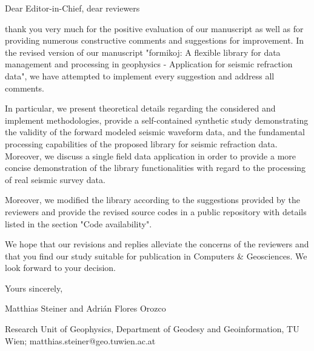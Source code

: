 \documentclass[a4paper,fleqn]{cas-sc}
\begin{document}
\begin{coverletter}

Dear Editor-in-Chief, dear reviewers
\newline

thank you very much for the positive evaluation of our manuscript as well as for providing numerous constructive comments and suggestions for improvement. In the revised version of our manuscript "formikoj: A flexible library for data management and processing in geophysics - Application for seismic refraction data", we have attempted to implement every suggestion and address all comments. 
\newline
 
In particular, we present theoretical details regarding the considered and implement methodologies, provide a self-contained synthetic study demonstrating the validity of the forward modeled seismic waveform data, and the fundamental processing capabilities of the proposed library for seismic refraction data. Moreover, we discuss a single field data application in order to provide a more concise demonstration of the library functionalities with regard to the processing of real seismic survey data.
\newline

Moreover, we modified the library according to the suggestions provided by the reviewers and provide the revised source codes in a public repository with details listed in the section "Code availability".
\newline

We hope that our revisions and replies alleviate the concerns of the reviewers and that you find our study suitable for publication in Computers \& Geosciences. We look forward to your decision.
\newline

Yours sincerely,
\newline

Matthias Steiner and Adrián Flores Orozco

Research Unit of Geophysics, Department of Geodesy and Geoinformation, TU Wien; matthias.steiner@geo.tuwien.ac.at
\newline

\end{coverletter}
 
\end{document}
